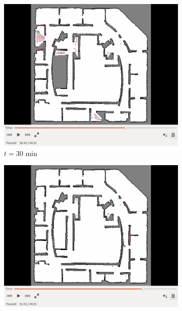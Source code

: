 \documentclass[smallextended]{svjour3}       %
\begin{document}
\begin{figure}[!ht]
\begin{subfigure}[t]{0.3\columnwidth}
        \label{fig:IRL25min}
    \end{subfigure}
    \begin{subfigure}[t]{0.3\columnwidth}
           \centering
           \includegraphics[trim = {4.6cm 3.8cm 4.6cm 0}, clip, width=\textwidth]{30min.png}
        \caption{$t=30$ min}
        \label{fig:IRL30min}
    \end{subfigure}
    \begin{subfigure}[t]{0.3\columnwidth}
           \centering
           \includegraphics[trim = {4.6cm 3.8cm 4.6cm 0}, clip, width=\textwidth]{35min.png}

\end{subfigure}
\end{figure}
\end{document}
